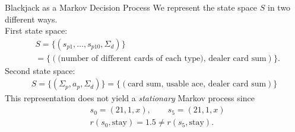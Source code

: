 \begin{frame}{Blackjack as a Markov Decision Process}
We represent the state space $S$ in two different ways.\\
First state space:
\begin{align*}
&S = \{  (s_{p1},\ldots,s_{p10},\Sigma_{d})  \} \\
&= \{ (\text{(number of different cards of each type), dealer card sum}) \}.
\end{align*}
\pause
Second state space:
\begin{align*}
S = \{  (\Sigma_p, a_p, \Sigma_d )  \}=\{  (\text{card sum, usable ace, dealer card sum})  \}
\end{align*}
This representation does not yield a \textit{stationary} Markov process since
\begin{align*}
	&s_0 = (21, 1, x),\qquad s_5 = (21,1,x)\\
	&r(s_0, \text{stay}) = 1.5 \neq r(s_5, \text{stay}). 
\end{align*}


\end{frame}


